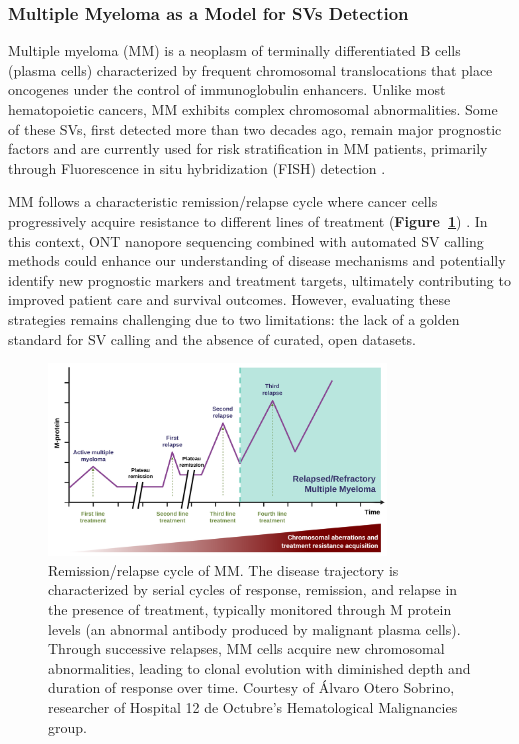 \subsubsection{Multiple Myeloma as a Model for SVs Detection}

Multiple myeloma (MM) is a neoplasm of terminally differentiated B cells (plasma 
cells) characterized by frequent chromosomal translocations that place oncogenes 
under the control of immunoglobulin enhancers. Unlike most hematopoietic cancers, 
MM exhibits complex chromosomal abnormalities. Some of these SVs, first detected 
more than two decades ago, remain major prognostic factors 
and are currently used for risk stratification in MM patients, primarily through 
Fluorescence in situ hybridization (FISH) detection \cite{kuehl_multiple_2002}.

MM follows a characteristic remission/relapse cycle where cancer cells progressively 
acquire resistance to different lines of treatment (\textbf{Figure~\ref{fig:evo_MM}})
\cite{kurtin_relapsed_2013}. In this context, ONT nanopore sequencing combined 
with automated SV calling methods could enhance our understanding of disease 
mechanisms and potentially identify new prognostic markers and treatment 
targets, ultimately contributing to improved patient care and survival outcomes. 
However, evaluating these strategies remains challenging due to two limitations: 
the lack of a golden standard for SV calling and the absence of curated, open 
datasets.

\begin{figure}[H]
    \centering
    \includegraphics[width=0.8\textwidth]{img/evo_MM.png}
    \caption[Remission/relapse cycle of Multiple Myeloma]{Remission/relapse 
    cycle of MM. The disease trajectory is characterized by serial cycles of 
    response, remission, and relapse in the presence of treatment, typically 
    monitored through M protein levels (an abnormal antibody produced by 
    malignant plasma cells). Through successive relapses, MM cells acquire new 
    chromosomal abnormalities, leading to clonal evolution with diminished 
    depth and duration of response over time. Courtesy of Álvaro Otero Sobrino, 
    researcher of Hospital 12 de Octubre's Hematological Malignancies group.}
    \label{fig:evo_MM}
\end{figure}


